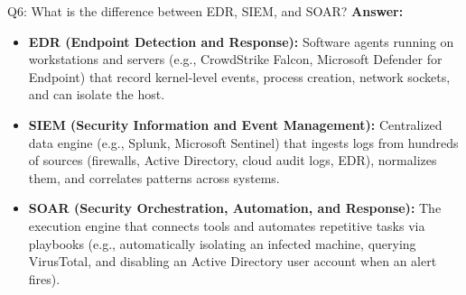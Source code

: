 \documentclass[10pt,a4paper]{article}
\begin{document}
\begin{qa}{Q6: What is the difference between EDR, SIEM, and SOAR?}
\textbf{Answer:}
\begin{itemize}[noitemsep]
    \item \textbf{EDR (Endpoint Detection and Response):} Software agents running on workstations and servers (e.g., CrowdStrike Falcon, Microsoft Defender for Endpoint) that record kernel-level events, process creation, network sockets, and can isolate the host.
    \item \textbf{SIEM (Security Information and Event Management):} Centralized data engine (e.g., Splunk, Microsoft Sentinel) that ingests logs from hundreds of sources (firewalls, Active Directory, cloud audit logs, EDR), normalizes them, and correlates patterns across systems.
    \item \textbf{SOAR (Security Orchestration, Automation, and Response):} The execution engine that connects tools and automates repetitive tasks via playbooks (e.g., automatically isolating an infected machine, querying VirusTotal, and disabling an Active Directory user account when an alert fires).
\end{itemize}
\end{qa}
\end{document}
